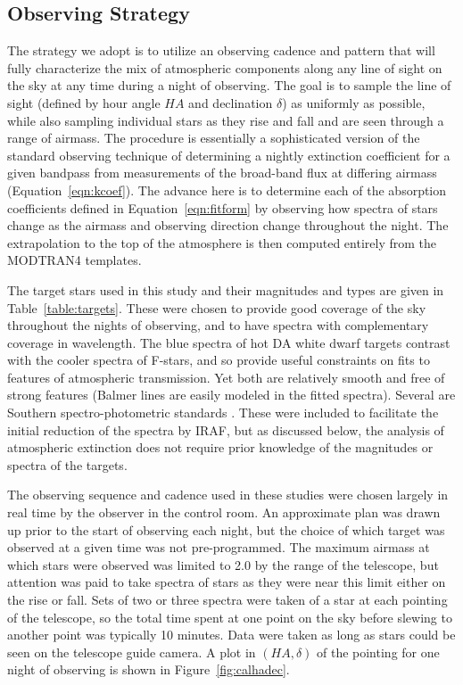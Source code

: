 \documentclass[manuscript]{aastex}
\begin{document}
\subsection{Observing Strategy}

The strategy we adopt is to utilize an observing cadence and pattern that will fully characterize the mix of atmospheric 
components along any line of sight on the sky at any time during a night of observing.
The goal is to sample the line of sight (defined by hour angle $HA$ and declination $\delta$) as uniformly as possible,
while also sampling individual stars as they rise and fall and are seen through a range of airmass.
The procedure is essentially a sophisticated version of the standard observing technique
of determining a nightly extinction coefficient for a given bandpass from measurements of the broad-band flux at differing airmass (Equation~\ref{eqn:kcoef}).
The advance here is to determine each of the absorption coefficients defined in Equation~\ref{eqn:fitform} by observing how
spectra of stars change as the airmass and observing direction change throughout the night.
The extrapolation to the top of the atmosphere is then computed entirely from the MODTRAN4 templates. 

The target stars used in this study and their magnitudes and types are given in Table~\ref{table:targets}.
These were chosen to provide good coverage of the sky throughout the nights of observing,
and to have spectra with complementary coverage in wavelength.
The blue spectra of hot DA white dwarf targets contrast with the cooler spectra of F-stars,
and so provide useful constraints on fits to features of atmospheric transmission.
Yet both are relatively smooth and free of strong features (Balmer lines are easily modeled in the fitted spectra).
Several are Southern spectro-photometric standards \cite{hamuy94}.
These were included to facilitate the initial reduction of the spectra by IRAF, but as discussed below, 
the analysis of atmospheric extinction does not require prior knowledge of the magnitudes or spectra of the targets.

The observing sequence and cadence used in these studies were chosen largely in real time by the observer in the control room.
An approximate plan was drawn up prior to the start of observing each night, but the choice of which target was observed at a given time
was not pre-programmed.
The maximum airmass at which stars were observed was limited to 2.0 by the range of the telescope, but 
attention was paid to take spectra of stars as they were near this limit either on the rise or fall. 
Sets of two or three spectra were taken of a star at each pointing of the telescope, so the total time spent at one point on the sky
before slewing to another point was typically 10 minutes.
Data were taken as long as stars could be seen on the telescope guide camera.
A plot in $(HA,\delta)$ of the pointing for one night of observing is shown in Figure~\ref{fig:calhadec}.
\end{document}
